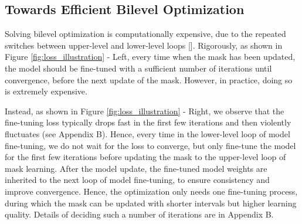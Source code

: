 \documentclass{article}
\begin{document}
\subsection{Towards Efficient Bilevel Optimization}
\label{sec:compute_efficiency}
Solving bilevel optimization is computationally expensive, due to the repeated switches between upper-level and lower-level loops []. Rigorously, as shown in Figure \ref{fig:loss_illustration} - Left, every time when the mask has been updated, the model should be fine-tuned with a sufficient number of iterations until convergence, before the next update of the mask. 
However, in practice, doing so is extremely expensive. 



Instead, as shown in Figure \ref{fig:loss_illustration} - Right, we observe that the fine-tuning loss typically drops fast in the first few iterations and then violently fluctuates (see Appendix B). Hence, every time in the lower-level loop of model fine-tuning, we do not wait for the loss to converge, but only fine-tune the model for the first few iterations before updating the mask to the upper-level loop of mask learning. After the model update, the fine-tuned model weights are inherited to the next loop of model fine-tuning, to ensure consistency and improve convergence. Hence, the optimization only needs one fine-tuning process, during which the mask can be updated with shorter intervals but higher learning quality. Details of deciding such a number of iterations are in Appendix B.

\end{document}
